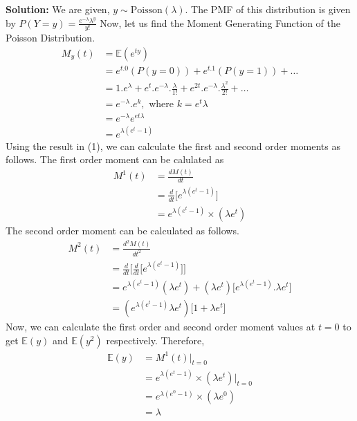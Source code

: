 \documentclass[11pt]{article}
\begin{document}
\textbf{Solution:} We are given, $y \sim \text{Poisson}(\lambda)$. The PMF of this distribution is given by $P(Y = y) = \frac{e^{-\lambda}\lambda^{y}}{y!}$ Now, let us find the Moment Generating Function of the Poisson Distribution.
\begin{equation}
  \begin{aligned}
    M_{y}(t) & = \mathbb{E}(e^{ty})\\
    & = e^{t.0}(P(y = 0)) + e^{t.1}(P(y = 1)) + \dots \\
    & = 1.e^{\lambda} + e^{t}.e^{-\lambda}.\frac{\lambda}{1!} + e^{2t}.e^{-\lambda}.\frac{\lambda^{2}}{2!} + \dots\\
    & = e^{-\lambda}.e^{k}, \text{ where } k = e^{t}\lambda \\
    & = e^{-\lambda} e^{e{t}\lambda}\\
    & = e^{\lambda(e^{t} - 1)}
  \end{aligned}
\end{equation}
Using the result in (1), we can calculate the first and second order moments as follows. The first order moment can be calulated as
\begin{equation}
  \nonumber
  \begin{aligned}
    M^{1}(t) & = \frac{dM(t)}{dt}\\
    & = \frac{d}{dt}\bigg[e^{\lambda(e^{t} - 1)}\bigg]\\
    & = e^{\lambda(e^{t} - 1)} \times (\lambda e^{t})
  \end{aligned}
\end{equation}
The second order moment can be calculated as follows.
\begin{equation}
  \nonumber
  \begin{aligned}
    M^{2}(t) & = \frac{d^{2}M(t)}{dt^{2}}\\
    & = \frac{d}{dt}\bigg[\frac{d}{dt}\bigg[e^{\lambda(e^{t} - 1)}\bigg]\bigg]\\
    & = e^{\lambda(e^{t} - 1)}(\lambda e^{t}) + (\lambda e^{t})\bigg[e^{\lambda(e^{t} - 1)}.\lambda e^{t}\bigg]\\
    & = (e^{\lambda(e^{t} -1)}\lambda e^{t})\bigg[1 + \lambda e^{t}\bigg]
  \end{aligned}
\end{equation}
Now, we can calculate the first order and second order moment values at $t = 0$ to get $\mathbb{E}(y)$ and $\mathbb{E}(y^{2})$ respectively. Therefore,
\begin{equation}
  \begin{aligned}
    \mathbb{E}(y) & = M^{1}(t) \rvert_{t = 0}\\
    & = e^{\lambda(e^{t} - 1)} \times (\lambda e^{t}) \bigg\rvert_{t = 0}\\
    & = e^{\lambda(e^{0} - 1)} \times (\lambda e^{0})\\
    & = \lambda
  \end{aligned}
\end{equation}
\end{document}
